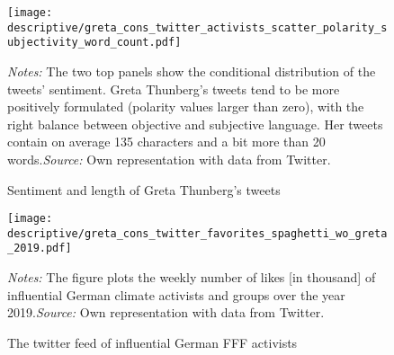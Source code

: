 \restoregeometry
\vspace*{\fill}
\begin{figure}[H]
	\centering\caption{Sentiment and length of Greta Thunberg's tweets}
	\label{fig_greta_cons:twitter_greta_sentiment_length}
	\texttt{[image: descriptive/greta\_cons\_twitter\_activists\_scatter\_polarity\_subjectivity\_word\_count.pdf]}
	\begin{minipage}{0.99\linewidth}
		\scriptsize{\emph{Notes:} The two top panels show the conditional distribution of the tweets' sentiment. Greta Thunberg's tweets tend to be more positively formulated (polarity values larger than zero), with the right balance between objective and subjective language. Her tweets contain on average 135 characters and a bit more than 20 words.\newline\emph{Source:} Own representation with data from Twitter.}
	\end{minipage}
\end{figure}
\vspace*{\fill}\clearpage
\vspace*{\fill}
\begin{figure}[H]
	\centering\caption{The twitter feed of influential German FFF activists}\label{fig_greta_cons:twitter_favorites_activists}
	\texttt{[image: descriptive/greta\_cons\_twitter\_favorites\_spaghetti\_wo\_greta\_2019.pdf]}
	\begin{minipage}{0.99\linewidth}
		\scriptsize{\emph{Notes:} The figure plots the weekly number of likes [in thousand] of influential German climate activists and groups over the year 2019.\newline\emph{Source:} Own representation with data from Twitter.}
	\end{minipage}
\end{figure}
\vspace*{\fill}\clearpage
